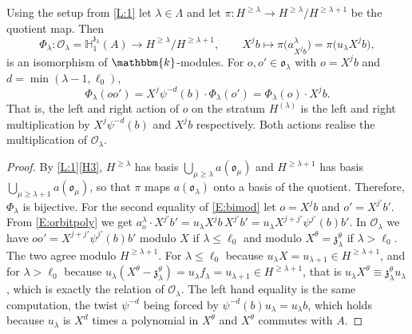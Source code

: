 \documentclass[a4paper,11pt]{amsart}
\numberwithin{equation}{subsection}
\theoremstyle{definition}
\theoremstyle{theorem}
\theoremstyle{remark}
\newcommand\CO{\mathcal{O}}
\newcommand\kapp{{\mathfrak{z}}}
\newcommand\Olam[1][\lambda]{\CO_{#1}}
\newcommand\olam[1][\lambda]{\mathfrak{o}_{#1}}
\newcommand\HH{\mathbb{H}}
\newcommand\kk{\mathbbm{k}}
\begin{document}
\begin{Lemma}\label{L:2}
  Using the setup from \autoref{L:1} let $\lambda\in\Lambda$ and let $\pi\colon H^{\ge\lambda}\to H^{\ge\lambda}/H^{\ge\lambda+1}$
  be the quotient map.  Then
  \[
    \Phi_\lambda\colon\Olam=\HH^{\kapp_\lambda}_1(A)\longrightarrow H^{\ge\lambda}/H^{\ge\lambda+1},
    \qquad X^{j}b\longmapsto\pi\bigl(a^{\lambda}_{X^{j}b}\bigr)=\pi\bigl(u_\lambda X^{j}b\bigr),
  \]
  is an isomorphism of $\kk$-modules. For  $o,o'\in\olam$ with
  $o=X^{j}b$ and $d=\min(\lambda-1,\ell_0)$,
  \begin{equation}\label{E:bimod}
    \Phi_\lambda(oo')=X^{j}\psi^{-d}(b)\cdot\Phi_\lambda(o')=\Phi_\lambda(o)\cdot X^{j}b .
  \end{equation}
  That is, the left and right action of $o$ on the stratum $H^{(\lambda)}$ is the left and  right
  multiplication by $X^{j}\psi^{-d}(b)$ and  $X^{j}b$  respectively. Both actions realise the multiplication of $\Olam$.
\end{Lemma}

\begin{proof}
  By \autoref{L:1}\autoref{H3}, $H^{\ge\lambda}$ has basis
  $\bigcup_{\mu\ge\lambda}a(\olam[\mu])$ and $H^{\ge\lambda+1}$ has basis
  $\bigcup_{\mu\ge\lambda+1}a(\olam[\mu])$, so that $\pi$ maps $a(\olam)$ onto a
  basis of the quotient. Therefore,  $\Phi_\lambda$ is bijective.  For the second
  equality of \autoref{E:bimod} let $o=X^{j}b$ and $o'=X^{j'}b'$.  From \autoref{E:orbitpoly} we get
  $
    a^{\lambda}_{o}\cdot X^{j'}b'=u_\lambda X^{j}b\,X^{j'}b'=u_\lambda X^{j+j'}\psi^{j'}(b)b' .
  $
  In $\Olam$ we have $oo'=X^{j+j'}\psi^{j'}(b)b'$ modulo $X$ if
  $\lambda\le\ell_0$ and modulo $X^{\theta}=\kapp_\lambda^{\theta}$ if
  $\lambda>\ell_0$.  The two agree modulo $H^{\ge\lambda+1}$. For
  $\lambda\le\ell_0$ because $u_\lambda X=u_{\lambda+1}\in H^{\ge\lambda+1}$,
  and for $\lambda>\ell_0$ because
  $u_\lambda(X^{\theta}-\kapp_\lambda^{\theta})=u_\lambda f_\lambda=u_{\lambda+1}\in H^{\ge\lambda+1}$,
  that is $u_\lambda X^{\theta}\equiv\kapp_\lambda^{\theta}u_\lambda$, which is
  exactly the relation of $\Olam$.  The left hand equality is the same
  computation, the twist $\psi^{-d}$ being forced by
  $\psi^{-d}(b)u_\lambda=u_\lambda b$, which holds because
  $u_\lambda$ is $X^{d}$ times a polynomial in $X^{\theta}$ and $X^{\theta}$
  commutes with $A$.
\end{proof}
\end{document}

